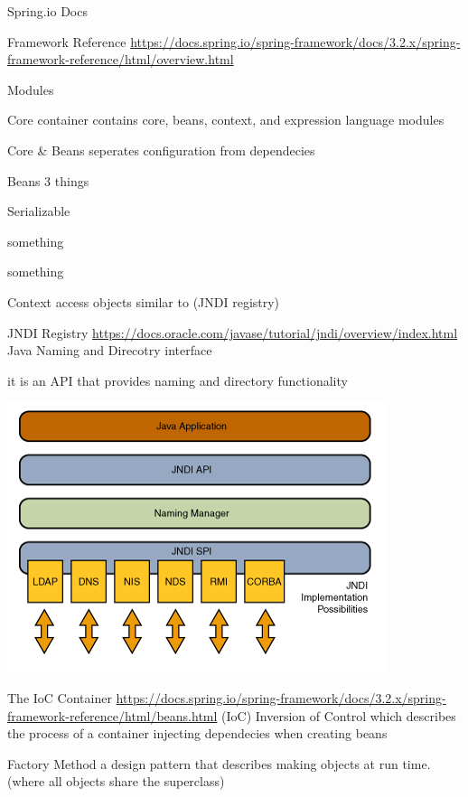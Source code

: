 \documentclass[presentation]{beamer}
\begin{document}
\begin{frame}[label={sec:org346ba75}]{Spring.io Docs}
\begin{block}{Framework Reference}
\url{https://docs.spring.io/spring-framework/docs/3.2.x/spring-framework-reference/html/overview.html}
\begin{block}{Modules}
\begin{block}{Core container}
contains core, beans, context, and expression language modules
\begin{block}{Core \& Beans}
seperates configuration from dependecies
\end{block}
\begin{block}{Beans}
3 things
\begin{block}{Serializable}
\end{block}
\begin{block}{something}
\end{block}
\begin{block}{something}
\end{block}
\end{block}
\begin{block}{Context}
access objects similar to (JNDI registry)
\begin{block}{JNDI Registry}
\url{https://docs.oracle.com/javase/tutorial/jndi/overview/index.html}
Java Naming and Direcotry interface

it is an API that provides naming and directory functionality
\begin{center}
\includegraphics[width=.9\linewidth]{./Resources/JNDI.png}
\end{center}
\end{block}
\end{block}
\end{block}
\end{block}
\end{block}
\begin{block}{The IoC Container}
\url{https://docs.spring.io/spring-framework/docs/3.2.x/spring-framework-reference/html/beans.html}
(IoC) Inversion of Control which describes the process of a container injecting dependecies when creating beans
\begin{block}{Factory Method}
a design pattern that describes making objects at run time. (where all objects share the superclass)
\end{block}
\end{block}
\end{frame}
\end{document}
